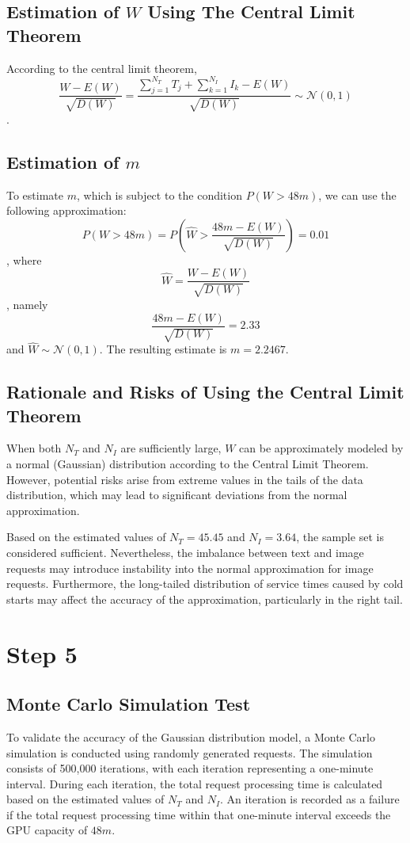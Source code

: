 \documentclass[10pt,a4paper]{article}
\begin{document}
	\subsection{Estimation of $W$ Using The Central Limit Theorem}
		According to the central limit theorem, 
		\[
			\frac{W-E(W)}{\sqrt{D(W)}} = \frac{{\sum_{j=1}^{N_T} T_j + \sum_{k=1}^{N_I} I_k}-E(W)}{\sqrt{D(W)}}
			\sim\mathcal{N}(0,1)
		\].
	
	\subsection{Estimation of $m$}
	To estimate $m$, which is subject to the condition
	$P(W>48m)$, we can use the following approximation:
	\[
	P(W>48m) = P(\hat{W} > \frac{48m-E(W)}{\sqrt{D(W)}}) = 0.01
	\],
	where
	\[
	\hat{W} = \frac{W-E(W)}{\sqrt{D(W)}}
	\], namely
	\[
		\frac{48m-E(W)}{\sqrt{D(W)}} = 2.33
	\]
	and $\hat{W}\sim\mathcal{N}(0,1)$.
	The resulting estimate is $m = 2.2467$.
	

	\subsection{Rationale and Risks of Using the Central Limit Theorem}
	
	When both $N_T$ and $N_I$ are sufficiently large, $W$ can be approximately modeled by a normal (Gaussian) distribution according to the Central Limit Theorem. However, potential risks arise from extreme values in the tails of the data distribution, which may lead to significant deviations from the normal approximation.
	
	Based on the estimated values of $N_T=45.45$ and $N_I=3.64$, the sample set is considered sufficient. Nevertheless, the imbalance between text and image requests may introduce instability into the normal approximation for image requests. Furthermore, the long-tailed distribution of service times caused by cold starts may affect the accuracy of the approximation, particularly in the right tail.

	\section{Step 5}
	\subsection{Monte Carlo Simulation Test}
	To validate the accuracy of the Gaussian distribution model, a Monte Carlo simulation is conducted using randomly generated requests. The simulation consists of 500,000 iterations, with each iteration representing a one-minute interval. During each iteration, the total request processing time is calculated based on the estimated values of $N_T$ and $N_I$. An iteration is recorded as a failure if the total request processing time within that one-minute interval exceeds the GPU capacity of $48m$. 
\end{document}
